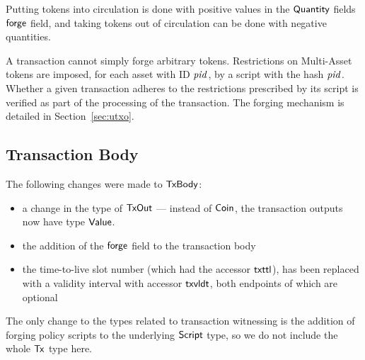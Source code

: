 Putting tokens into circulation is done with positive values in the $\mathsf{Quantity}$
fields $\mathsf{forge}$ field, and taking tokens out of circulation can be done
with negative quantities.

A transaction cannot simply forge arbitrary tokens. Restrictions on
Multi-Asset tokens are imposed, for each asset with ID $\mathit{pid}$, by a script
with the hash $\mathit{pid}$. Whether a given transaction adheres to the restrictions
prescribed by its script is verified as part of the processing of the transaction.
The forging mechanism is detailed in Section~\ref{sec:utxo}.

\subsection*{Transaction Body}

The following changes were made to $\mathsf{TxBody}$:

\begin{itemize}
  \item a change in the type of $\mathsf{TxOut}$ --- instead of
$\mathsf{Coin}$, the transaction outputs now have type $\mathsf{Value}$.
  \item the addition of the $\mathsf{forge}$ field to the transaction body
  \item the time-to-live slot number (which had the accessor $\mathsf{txttl}$),
  has been replaced with a validity interval with accessor $\mathsf{txvldt}$,
  both endpoints of which are optional
\end{itemize}

The only change to the types related to transaction witnessing is the addition
of forging policy scripts to the underlying $\mathsf{Script}$ type, so we do not include the
whole $\mathsf{Tx}$ type here.
